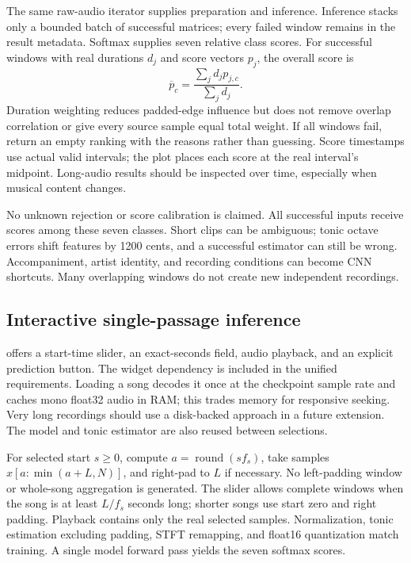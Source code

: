 \documentclass[11pt,a4paper]{article}
\begin{document}
The same raw-audio iterator supplies preparation and inference. Inference stacks
only a bounded batch of successful matrices; every failed window remains in the
result metadata. Softmax supplies seven relative class scores. For successful
windows with real durations $d_j$ and score vectors $p_j$, the overall score is
\[
\overline p_c=\frac{\sum_j d_jp_{j,c}}{\sum_j d_j}.
\]
Duration weighting reduces padded-edge influence but does not remove overlap
correlation or give every source sample equal total weight. If all windows fail,
return an empty ranking with the reasons rather than guessing. Score timestamps
use actual valid intervals; the plot places each score at the real interval's
midpoint. Long-audio results should be inspected over time, especially when
musical content changes.

No unknown rejection or score calibration is claimed. All successful inputs
receive scores among these seven classes. Short clips can be ambiguous; tonic
octave errors shift features by 1200 cents, and a successful estimator can still
be wrong. Accompaniment, artist identity, and recording conditions can become CNN
shortcuts. Many overlapping windows do not create new independent recordings.

\subsection{Interactive single-passage inference}
 offers a start-time slider,
an exact-seconds field, audio playback, and an explicit prediction button.
The widget dependency is included in the unified requirements. Loading a song
decodes it once at the checkpoint sample rate and caches mono float32 audio in
RAM; this trades memory for responsive seeking. Very long recordings should
use a disk-backed approach in a future extension. The model and tonic estimator
are also reused between selections.

For selected start $s\ge0$, compute $a=\operatorname{round}(sf_s)$, take samples
$x[a:\min(a+L,N)]$, and right-pad to $L$ if necessary. No left-padding window
or whole-song aggregation is generated. The slider allows complete windows when
the song is at least $L/f_s$ seconds long; shorter songs use start zero and right
padding. Playback contains only the real selected samples. Normalization, tonic
estimation excluding padding, STFT remapping, and float16 quantization match
training. A single model forward pass yields the seven softmax scores.
\end{document}

